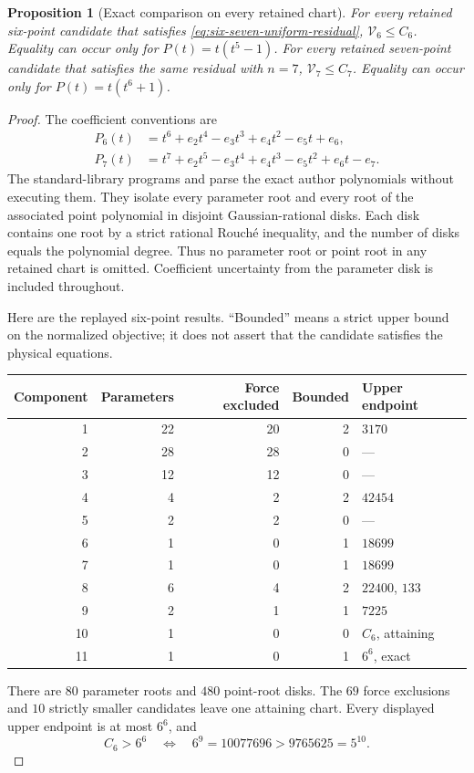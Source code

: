 \documentclass[11pt]{article}
\newtheorem{proposition}[theorem]{Proposition}
\theoremstyle{remark}
\numberwithin{equation}{section}
\begin{document}
\begin{proposition}[Exact comparison on every retained chart]
\label{prop:six-seven-retained-comparison}
For every retained six-point candidate that satisfies
\eqref{eq:six-seven-uniform-residual},
$\mathcal V_6\le C_6$. Equality can occur only for
$P(t)=t(t^5-1)$.
For every retained seven-point candidate that satisfies the same
residual with $n=7$, $\mathcal V_7\le C_7$. Equality can occur only
for $P(t)=t(t^6+1)$.
\end{proposition}
\begin{proof}
The coefficient conventions are
\[
 \begin{split}
 P_6(t)&=t^6+e_2t^4-e_3t^3+e_4t^2-e_5t+e_6,\\
 P_7(t)&=t^7+e_2t^5-e_3t^4+e_4t^3-e_5t^2+e_6t-e_7.
 \end{split}
\]
The standard-library programs
 and
 parse the exact author polynomials
without executing them. They isolate every parameter root and every
root of the associated point polynomial in disjoint Gaussian-rational
disks. Each disk contains one root by a strict rational Rouch\'e
inequality, and the number of disks equals the polynomial degree.
Thus no parameter root or point root in any retained chart is omitted.
Coefficient uncertainty from the parameter disk is included throughout.

Here are the replayed six-point results. ``Bounded'' means a strict
upper bound on the normalized objective; it does not assert that the
candidate satisfies the physical equations.
\begin{center}
\begin{tabular}{rrrrl}
\toprule
Component&Parameters&Force excluded&Bounded&Upper endpoint\\
\midrule
1&22&20&2&$3170$\\
2&28&28&0&---\\
3&12&12&0&---\\
4&4&2&2&$42454$\\
5&2&2&0&---\\
6&1&0&1&$18699$\\
7&1&0&1&$18699$\\
8&6&4&2&$22400$, $133$\\
9&2&1&1&$7225$\\
10&1&0&0&$C_6$, attaining\\
11&1&0&1&$6^6$, exact\\
\bottomrule
\end{tabular}
\end{center}
There are $80$ parameter roots and $480$ point-root disks.
The $69$ force exclusions and $10$ strictly smaller candidates leave
one attaining chart. Every displayed upper endpoint is at most $6^6$,
and
\[
 C_6>6^6\quad\Longleftrightarrow\quad
 6^9=10077696>9765625=5^{10}.
\]


\end{proof}
\end{document}
